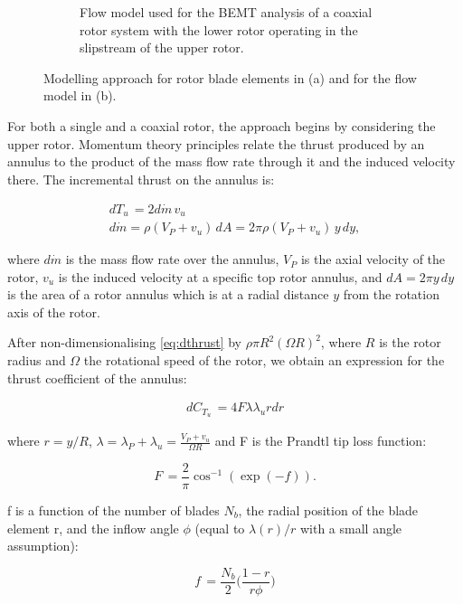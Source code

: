 \begin{figure}[]
\begin{subfigure}[t]{0.5\textwidth}
    \caption{Flow model used for the BEMT analysis of a coaxial rotor system with the lower rotor operating in the slipstream of the upper rotor. }
    \label{fig:disks}
\end{subfigure}
    \captionsetup{justification=centering}
    \caption{Modelling approach for rotor blade elements in (a) and for the flow model in (b).}
    \label{fig:BEMT}
\end{figure}


For both a single and a coaxial rotor, the approach begins by considering the upper rotor. Momentum theory principles relate the thrust produced by an annulus to the product of the mass flow rate through it and the induced velocity there. The incremental thrust on the annulus is:

\begin{align}
 dT_u\, = 2d\dot{m}\, v_u \label{eq:dthrust} \\
  d\dot{m} = \rho(V_P+v_u)\,dA = 2\pi\rho(V_P+v_u)\,y\, dy,
\end{align}

where $d\dot{m}$ is the mass flow rate over the annulus, $V_P$ is the axial velocity of the rotor, $v_u$ is the induced velocity at a specific top rotor annulus, and $dA = 2\pi y\, dy$ is the area of a rotor annulus which is at a radial distance $y$ from the rotation axis of the rotor.

After non-dimensionalising \autoref{eq:dthrust} by $\rho \pi R^2 (\Omega R)^2$, where $R$ is the rotor radius and $\Omega$ the rotational speed of the rotor, we obtain an expression for the thrust coefficient of the annulus:

\begin{align}
 dC_{T_u}\, = 4 F \lambda \lambda_u r dr \label{eq:dCthrust} 
\end{align}

where $r=y/R$, $\lambda= \lambda_P+\lambda_u = \frac{V_P+v_u}{\Omega R}$ and F is the Prandtl tip loss function:

\begin{equation}
 F\, = \frac{2}{\pi} \cos^{-1}(\exp(-f)). \label{eq:prandtl} 
\end{equation}

f is a function of the number of blades $N_b$, the radial position of the blade element r, and the inflow angle $\phi$ (equal to $\lambda(r)/r$ with a small angle assumption):

\begin{equation}
 f\, = \frac{N_b}{2} \Big(\frac{1-r}{r \phi} \Big) \label{eq:f}
\end{equation}

